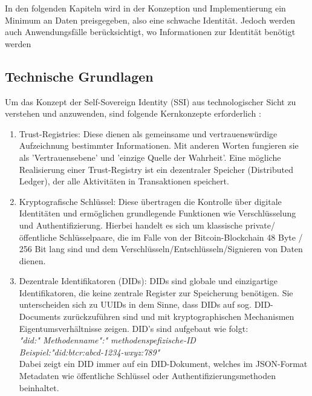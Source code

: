 In den folgenden Kapiteln wird in der Konzeption und Implementierung ein Minimum an Daten preisgegeben, also eine schwache Identität. Jedoch werden auch Anwendungsfälle berücksichtigt, wo Informationen zur Identität benötigt werden

\subsection{Technische Grundlagen}
Um das Konzept der Self-Sovereign Identity (SSI) aus technologischer Sicht zu verstehen und anzuwenden, sind folgende Kernkonzepte erforderlich \cite{ID16} \cite{ID17}:

\begin{enumerate}
	\item Trust-Registries: Diese dienen als gemeinsame und vertrauenswürdige Aufzeichnung bestimmter Informationen. Mit anderen Worten fungieren sie als 'Vertrauensebene' und 'einzige Quelle der Wahrheit'. Eine mögliche Realisierung einer Trust-Registry ist ein dezentraler Speicher (Distributed Ledger), der alle Aktivitäten in Transaktionen speichert.
	
	\item Kryptografische Schlüssel: Diese übertragen die Kontrolle über digitale Identitäten und ermöglichen grundlegende Funktionen wie Verschlüsselung und Authentifizierung. Hierbei handelt es sich um klassische private/öffentliche Schlüsselpaare, die im Falle von der Bitcoin-Blockchain 48 Byte / 256 Bit lang sind \cite{ID15} und dem Verschlüsseln/Entschlüsseln/Signieren von Daten dienen.
	
	\item Dezentrale Identifikatoren (DIDs): DIDs sind globale und einzigartige Identifikatoren, die keine zentrale Register zur Speicherung benötigen. Sie unterscheiden sich zu UUIDs in dem Sinne, dass DIDs auf sog. DID-Documents zurückzuführen sind und mit kryptographischen Mechanismen Eigentumsverhältnisse zeigen. DID's sind aufgebaut wie folgt:\\
	\textsl{"did:" \textlangle Methodenname\textrangle ":" \textlangle methodenspefizische-ID\textrangle\\
	Beispiel:"did:btcr:abcd-1234-wxyz:789"}\\
	Dabei zeigt ein DID immer auf ein DID-Dokument, welches im JSON-Format Metadaten wie öffentliche Schlüssel oder Authentifizierungsmethoden beinhaltet.
	

\end{enumerate}
